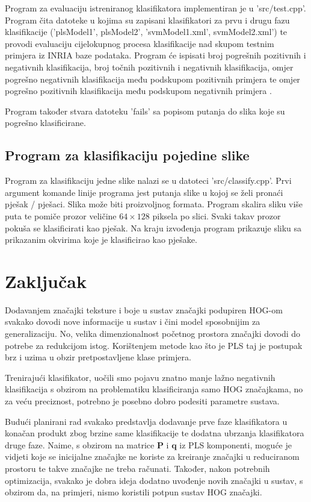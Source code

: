 \documentclass[seminar]{fer}
\begin{document}
Program za evaluaciju istreniranog klasifikatora implementiran je u 'src/test.cpp'. Program čita datoteke u kojima su zapisani klasifikatori za prvu i drugu fazu klasifikacije ('plsModel1', plsModel2', 'svmModel1.xml', svmModel2.xml') te provodi evaluaciju cijelokupnog procesa klasifikacije nad skupom testnim primjera iz INRIA baze podataka. Program će ispisati broj pogrešnih pozitivnih i negativnih klasifikacija, broj točnih pozitivnih i negativnih klasifikacija, omjer pogrešno negativnih klasifikacija među podskupom pozitivnih primjera  te omjer pogrešno pozitivnih klasifikacija među podskupom negativnih primjera . 

Program također stvara datoteku 'fails' sa popisom putanja do slika koje su pogrešno klasificirane. 

\section{Program za klasifikaciju pojedine slike}

Program za klasifikaciju jedne slike nalazi se u datoteci 'src/classify.cpp'. Prvi argument komande linije programa jest putanja slike u kojoj se želi pronaći pješak / pješaci. Slika može biti proizvoljnog formata. Program skalira sliku više puta te  pomiče prozor veličine $64 \times 128$ piksela po slici. Svaki takav prozor pokuša se klasificirati kao pješak. Na kraju izvođenja program prikazuje sliku sa prikazanim okvirima koje je klasificirao kao pješake.

\chapter{Zaključak}

Dodavanjem značajki teksture i boje u sustav značajki podupiren HOG-om svakako dovodi nove informacije u sustav i čini model sposobnijim za generalizaciju. No, velika dimenzionalnost  početnog prostora značajki dovodi do potrebe za redukcijom istog. Korištenjem metode kao što je PLS taj je postupak brz i uzima u obzir  pretpostavljene klase primjera.

Trenirajući klasifikator, uočili smo pojavu znatno manje lažno negativnih klasifikacija s obzirom na problematiku klasificiranja samo HOG značajkama, no za veću preciznost, potrebno je posebno dobro podesiti parametre sustava.

Budući planirani rad svakako predstavlja dodavanje prve faze klasifikatora u konačan produkt zbog brzine same klasifikacije te dodatna ubrzanja klasifikatora druge faze. Naime, s obzirom na matrice $\mathbf{P}$ i $\mathbf{q}$ iz PLS komponenti, moguće je vidjeti koje se inicijalne značajke ne koriste za kreiranje  značajki u reduciranom prostoru te takve značajke ne treba računati. Također, nakon potrebnih optimizacija, svakako je dobra ideja dodatno uvođenje novih značajki u sustav, s obzirom da, na primjeri, nismo koristili potpun sustav HOG značajki.




\end{document}
